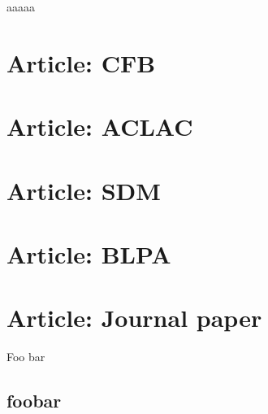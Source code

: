 \documentclass[doctoral,utf8,lot,loar,lof,shortloft,index]{jydiss}
\begin{document}
\preface

 aaaaa

\acknowledgements



\mainmatter









\chapter{Article: CFB}


\chapter{Article: ACLAC}


\chapter{Article: SDM}


\chapter{Article: BLPA}


\chapter{Article: Journal paper}


\tailmatter
\finnishsummary
Foo bar


%
\appendices
{}
\section{foobar}

\backmatter


\printindex
\end{document}
